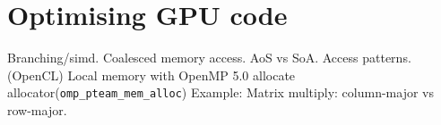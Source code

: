 

\chapter{Optimising GPU code}
Branching/simd.
Coalesced memory access. AoS vs SoA. Access patterns.
(OpenCL) Local memory with OpenMP 5.0 allocate allocator(\texttt{omp\_pteam\_mem\_alloc})
Example: Matrix multiply: column-major vs row-major.
